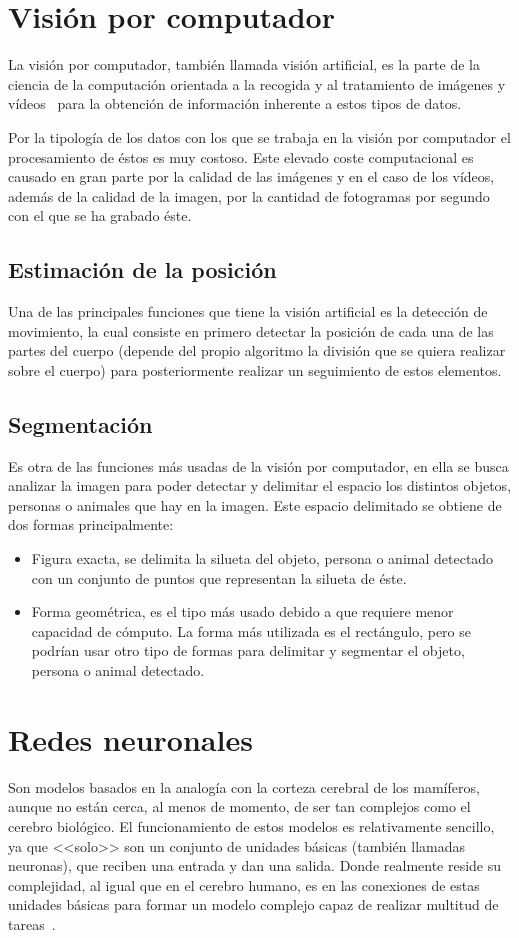 \section{Visión por computador}
La visión por computador, también llamada visión artificial, es la parte de la ciencia de la computación orientada a la recogida y al tratamiento de imágenes y vídeos~\cite{wiki:visionartifical,cnn} para la obtención de información inherente a estos tipos de datos.

Por la tipología de los datos con los que se trabaja en la visión por computador el procesamiento de éstos es muy costoso. Este elevado coste computacional es causado en gran parte por la calidad de las imágenes y en el caso de los vídeos, además de la calidad de la imagen, por la cantidad de fotogramas por segundo con el que se ha grabado éste.

\subsection{Estimación de la posición}
Una de las principales funciones que tiene la visión artificial es la detección de movimiento, la cual consiste en primero detectar la posición de cada una de las partes del cuerpo (depende del propio algoritmo la división que se quiera realizar sobre el cuerpo) para posteriormente realizar un seguimiento de estos elementos.

\subsection{Segmentación}
Es otra de las funciones más usadas de la visión por computador, en ella se busca analizar la imagen para poder detectar y delimitar el espacio los distintos objetos, personas o animales que hay en la imagen. Este espacio delimitado se obtiene de dos formas principalmente:
\begin{itemize}
	\item Figura exacta, se delimita la silueta del objeto, persona o animal detectado con un conjunto de puntos que representan la silueta de éste.
	\item Forma geométrica, es el tipo más usado debido a que requiere menor capacidad de cómputo. La forma más utilizada es el rectángulo, pero se podrían usar otro tipo de formas para delimitar y segmentar el objeto, persona o animal detectado.
\end{itemize}

\section{Redes neuronales}
Son modelos basados en la analogía con la corteza cerebral de los mamíferos, aunque no están cerca, al menos de momento, de ser tan complejos como el cerebro biológico. El funcionamiento de estos modelos es relativamente sencillo, ya que <<solo>> son un conjunto de unidades básicas (también llamadas neuronas), que reciben una entrada y dan una salida. Donde realmente reside su complejidad, al igual que en el cerebro humano, es en las conexiones de estas unidades básicas para formar un modelo complejo capaz de realizar multitud de tareas~\cite{cnn}.

